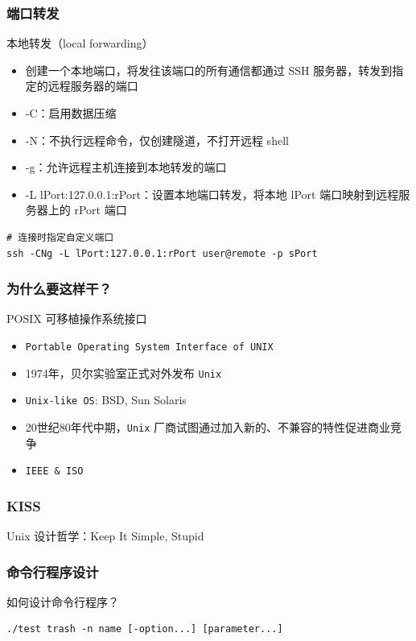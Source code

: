 \documentclass[UTF8, 16pt]{beamer}
\begin{document}
\begin{frame}[fragile]
    \frametitle{端口转发}
    \textcolor{sufered}{本地转发（local forwarding）}
    \begin{itemize}
        \item 创建一个本地端口，将发往该端口的所有通信都通过 SSH 服务器，转发到指定的远程服务器的端口
        \item -C：启用数据压缩
        \item -N：不执行远程命令，仅创建隧道，不打开远程 shell
        \item -g：允许远程主机连接到本地转发的端口
        \item -L lPort:127.0.0.1:rPort：设置本地端口转发，将本地 lPort 端口映射到远程服务器上的 rPort 端口
    \end{itemize}
    
    \begin{lstlisting}
# 连接时指定自定义端口
ssh -CNg -L lPort:127.0.0.1:rPort user@remote -p sPort
    \end{lstlisting}
\end{frame}

\begin{frame}[fragile]
    \frametitle{为什么要这样干？}
    
    \textcolor{sufered}{POSIX 可移植操作系统接口}
    
    \begin{itemize}
        \item \texttt{Portable Operating System Interface of UNIX}
        \item 1974年，贝尔实验室正式对外发布 \texttt{Unix}
        \item \texttt{Unix-like OS}: BSD, Sun Solaris
        \item 20世纪80年代中期，\texttt{Unix} 厂商试图通过加入新的、不兼容的特性促进商业竞争
        \item \texttt{IEEE \& ISO}
    \end{itemize}
\end{frame}

\begin{frame}
    \frametitle{KISS}
    
    \textcolor{sufered}{Unix 设计哲学：Keep It Simple, Stupid}
\end{frame}

\begin{frame}[fragile]
    \frametitle{命令行程序设计}
    \textcolor{sufered}{如何设计命令行程序？}
    \begin{lstlisting}[numbers=none]
./test trash -n name [-option...] [parameter...]
    \end{lstlisting}
\end{frame}
\end{document}
